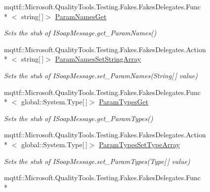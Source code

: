 \begin{DoxyCompactItemize}
mqttf\-::\-Microsoft.\-Quality\-Tools.\-Testing.\-Fakes.\-Fakes\-Delegates.\-Func\\*
$<$ string\mbox{[}$\,$\mbox{]}$>$ \hyperlink{class_system_1_1_runtime_1_1_serialization_1_1_formatters_1_1_fakes_1_1_stub_i_soap_message_aa362f34c2a8d9b076bdbfb6f345428cc}{Param\-Names\-Get}
\begin{DoxyCompactList}\small\item\em Sets the stub of I\-Soap\-Message.\-get\-\_\-\-Param\-Names()\end{DoxyCompactList}\item 
mqttf\-::\-Microsoft.\-Quality\-Tools.\-Testing.\-Fakes.\-Fakes\-Delegates.\-Action\\*
$<$ string\mbox{[}$\,$\mbox{]}$>$ \hyperlink{class_system_1_1_runtime_1_1_serialization_1_1_formatters_1_1_fakes_1_1_stub_i_soap_message_aa838382ce6f2c59a1511107bdd8188e2}{Param\-Names\-Set\-String\-Array}
\begin{DoxyCompactList}\small\item\em Sets the stub of I\-Soap\-Message.\-set\-\_\-\-Param\-Names(\-String\mbox{[}$\,$\mbox{]} value)\end{DoxyCompactList}\item 
mqttf\-::\-Microsoft.\-Quality\-Tools.\-Testing.\-Fakes.\-Fakes\-Delegates.\-Func\\*
$<$ global\-::\-System.\-Type\mbox{[}$\,$\mbox{]}$>$ \hyperlink{class_system_1_1_runtime_1_1_serialization_1_1_formatters_1_1_fakes_1_1_stub_i_soap_message_a5c1ac45397be11ad69fb77281e6d8c97}{Param\-Types\-Get}
\begin{DoxyCompactList}\small\item\em Sets the stub of I\-Soap\-Message.\-get\-\_\-\-Param\-Types()\end{DoxyCompactList}\item 
mqttf\-::\-Microsoft.\-Quality\-Tools.\-Testing.\-Fakes.\-Fakes\-Delegates.\-Action\\*
$<$ global\-::\-System.\-Type\mbox{[}$\,$\mbox{]}$>$ \hyperlink{class_system_1_1_runtime_1_1_serialization_1_1_formatters_1_1_fakes_1_1_stub_i_soap_message_a674e294dd91ff8a9e22481c4880d8145}{Param\-Types\-Set\-Type\-Array}
\begin{DoxyCompactList}\small\item\em Sets the stub of I\-Soap\-Message.\-set\-\_\-\-Param\-Types(\-Type\mbox{[}$\,$\mbox{]} value)\end{DoxyCompactList}\item 
mqttf\-::\-Microsoft.\-Quality\-Tools.\-Testing.\-Fakes.\-Fakes\-Delegates.\-Func\\*

\end{DoxyCompactItemize}
